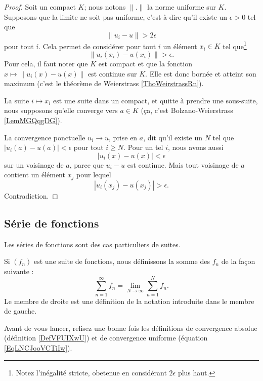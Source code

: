 \begin{proof}
	Soit un compact \( K\); nous notons \( \| . \|\) la norme uniforme sur \( K\). Supposons que la limite ne soit pas uniforme, c'est-à-dire qu'il existe un \( \epsilon>0\) tel que
	\begin{equation}
		\| u_i-u \|> 2\epsilon
	\end{equation}
	pour tout \( i\). Cela permet de considérer pour tout \( i\) un élément \( x_i\in K\) tel que\footnote{Notez l'inégalité stricte, obetenue en considérant \( 2\epsilon\) plus haut.}
	\begin{equation}
		\| u_i(x_i)-u(x_i) \|> \epsilon.
	\end{equation}
	Pour cela, il faut noter que \( K\) est compact et que la fonction \( x\mapsto \| u_i(x)-u(x) \|\) est continue sur \( K\). Elle est donc bornée et atteint son maximum (c'est le théorème de Weierstrass \ref{ThoWeirstrassRn}).

	La suite \( i\mapsto x_i\) est une suite dans un compact, et quitte à prendre une sous-suite, nous supposons qu'elle converge vers \( a\in K\) (ça, c'est Bolzano-Weierstrass \ref{LemMGQqgDG}).

	La convergence ponctuelle \( u_i\to u\), prise en \( a\), dit qu'il existe un \( N\) tel que \( | u_i(a)-u(a) |<\epsilon\) pour tout \( i\geq N\). Pour un tel \( i\), nous avons aussi
	\begin{equation}
		| u_i(x)-u(x) |<\epsilon
	\end{equation}
	sur un voisinage de \( a\), parce que \( u_i-u\) est continue. Mais tout voisinage de \( a\) contient un élément \( x_j\) pour lequel
	\begin{equation}
		| u_i(x_j)-u(x_j) |>\epsilon.
	\end{equation}
	Contradiction.
\end{proof}

\subsection{Série de fonctions}

Les séries de fonctions sont des cas particuliers de suites.

\begin{definition}      \label{DEFooYEIUooCAgrxI}
	Si \( (f_n)\) est une suite de fonctions, nous définissons la somme des \( f_n\) de la façon suivante :
	\begin{equation}
		\sum_{n=1}^{\infty}f_n=\lim_{N\to \infty} \sum_{n=1}^{N}f_n.
	\end{equation}
	Le membre de droite est une définition de la notation introduite dans le membre de gauche.
\end{definition}
Avant de vous lancer, relisez une bonne fois les définitions de convergence absolue (définition \ref{DefVFUIXwU}) et de convergence uniforme (équation \ref{EqLNCJooVCTiIw}).


